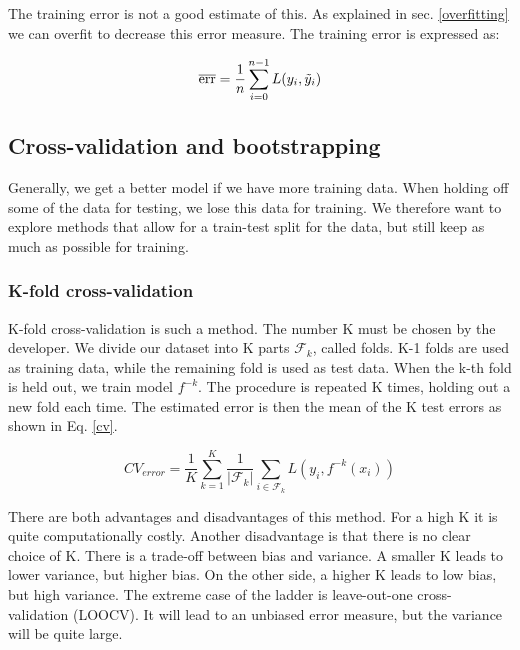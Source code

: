 The training error is not a good estimate of this. As explained in sec. \ref{overfitting} we can overfit to decrease this error measure. The training error is expressed as: 

\begin{equation}
    \overline{\text{err}} = \frac{1}{n}\sum_{i=0}^{n-1} L(y_i, \Tilde{y}_i)
\end{equation} 




\subsection{Cross-validation and bootstrapping}

Generally, we get a better model if we have more training data.  When holding off some of the data for testing, we lose this data for training. We therefore want to explore methods that allow for a train-test split for the data, but still keep as much as possible for training. 

\subsubsection{K-fold cross-validation}
K-fold cross-validation is such a method. The number K must be chosen by the developer. We divide our dataset into K parts $\mathcal{F}_k$, called folds. K-1 folds are used as training data, while the remaining fold is used as test data. When the k-th fold is held out, we train model $f^{-k}$. 
The procedure is repeated K times, holding out a new fold each time. The estimated error is then the mean of the K test errors as shown in Eq. \ref{cv}.

\begin{equation}\label{cv}
    CV_{error} = \frac{1}{K} \sum_{k=1}^{K} \frac{1}{|\mathcal{F}_k|} \sum_{i \in \mathcal{F}_k} L\left(y_i, f^{-k}({x}_i)\right) 
\end{equation}

There are both advantages and disadvantages of this method. For a high K it is quite computationally costly. Another disadvantage is that there is no clear choice of K. There is a trade-off between bias and variance. A smaller K leads to lower variance, but higher bias. On the other side, a higher K leads to low bias, but high variance. The extreme case of the ladder is leave-out-one cross-validation (LOOCV). It will lead to an unbiased error measure, but the variance will be quite large. 

